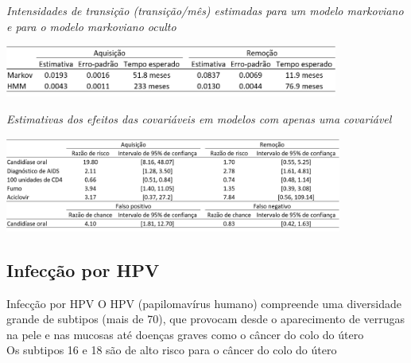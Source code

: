 \documentclass[ignorenonframetext,]{beamer}
\begin{document}
\begin{frame}

\footnotesize \textit{Intensidades de transição (transição/mês)
                      estimadas para um modelo markoviano e para o
                      modelo markoviano oculto}

\includegraphics*[height = 1.7cm]{iBagens/t1.png}

\pause
\vspace{.2cm}
\textit{Estimativas dos efeitos das covariáveis em modelos com apenas  
        uma covariável}

\includegraphics*[height = 3.1cm]{iBagens/t2.png}

\end{frame}

\subsection{Infecção por HPV}\label{infeccao-por-hpv}

\begin{frame}

\pause

\begin{block}{Infecção por HPV}
 \pause
 \vspace{-.2cm}
 O HPV (papilomavírus humano) compreende uma diversidade grande de
 subtipos (mais de 70), que provocam desde o aparecimento de verrugas na
 pele e nas mucosas até doenças graves como o câncer do colo do útero \\
 \vspace{.4cm}
 Os subtipos 16 e 18 são de alto risco para o câncer do colo do útero
\end{block}

\end{frame}
\end{document}

